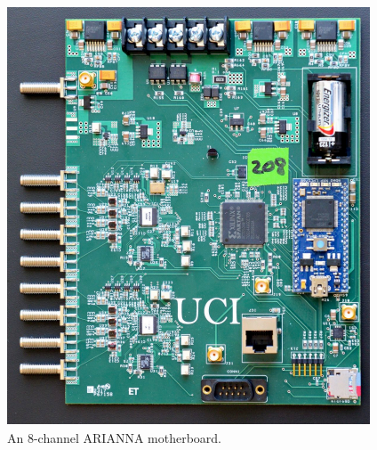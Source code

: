 \documentclass[journal]{IEEEtran}
\begin{document}
\begin{figure}[h!]
	\centering
	\includegraphics[scale=0.55]{mboard.png}
	\caption{An 8-channel ARIANNA motherboard.}
	\label{ARIANNA motherboard}
\end{figure}



 



\end{document}
